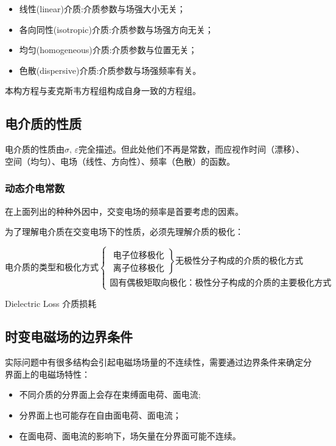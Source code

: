     \begin{itemize}
        \item 线性(linear)介质:介质参数与场强大小无关；
        \item 各向同性(isotropic)介质:介质参数与场强方向无关；
        \item 均匀(homogeneous)介质:介质参数与位置无关；
        \item 色散(dispersive)介质:介质参数与场强频率有关。
    \end{itemize}

    本构方程与麦克斯韦方程组构成自身一致的方程组。

    \subsection{电介质的性质}
    电介质的性质由$\sigma,\,\varepsilon$完全描述。但此处他们不再是常数，而应视作时间（漂移）、空间（均匀）、电场（线性、方向性）、频率（色散）的函数。

    \subsubsection{动态介电常数}

    在上面列出的种种外因中，交变电场的频率是首要考虑的因素。

    为了理解电介质在交变电场下的性质，必须先理解介质的极化：

    \begin{equation*}
    \mbox{电介质的类型和极化方式}
    \begin{cases}
        \left.\begin{array}{l}
            \mbox{电子位移极化}\\
            \mbox{离子位移极化}
        \end{array}\right\rbrace\mbox{无极性分子构成的介质的极化方式}\\
        \mbox{固有偶极矩取向极化：极性分子构成的介质的主要极化方式}
    \end{cases}
    \end{equation*}


Dielectric Loss 介质损耗
    \subsection{时变电磁场的边界条件}
    实际问题中有很多结构会引起电磁场场量的不连续性，需要通过边界条件来确定分界面上的电磁场特性：
    \begin{itemize}
        \item 不同介质的分界面上会存在束缚面电荷、面电流;
        \item 分界面上也可能存在自由面电荷、面电流；
        \item 在面电荷、面电流的影响下，场矢量在分界面可能不连续。
    \end{itemize}

